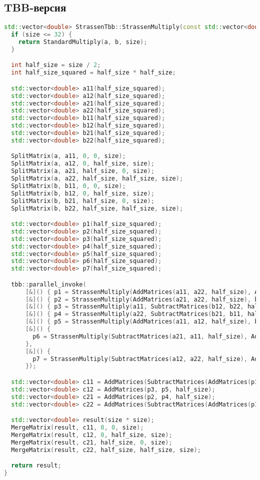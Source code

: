 \documentclass[14pt,a4paper]{extarticle}
\begin{document}
\subsection{TBB-версия}
\begin{lstlisting}[language=C++]
std::vector<double> StrassenTbb::StrassenMultiply(const std::vector<double>& a, const std::vector<double>& b, int size) {
  if (size <= 32) {
    return StandardMultiply(a, b, size);
  }

  int half_size = size / 2;
  int half_size_squared = half_size * half_size;

  std::vector<double> a11(half_size_squared);
  std::vector<double> a12(half_size_squared);
  std::vector<double> a21(half_size_squared);
  std::vector<double> a22(half_size_squared);
  std::vector<double> b11(half_size_squared);
  std::vector<double> b12(half_size_squared);
  std::vector<double> b21(half_size_squared);
  std::vector<double> b22(half_size_squared);

  SplitMatrix(a, a11, 0, 0, size);
  SplitMatrix(a, a12, 0, half_size, size);
  SplitMatrix(a, a21, half_size, 0, size);
  SplitMatrix(a, a22, half_size, half_size, size);
  SplitMatrix(b, b11, 0, 0, size);
  SplitMatrix(b, b12, 0, half_size, size);
  SplitMatrix(b, b21, half_size, 0, size);
  SplitMatrix(b, b22, half_size, half_size, size);

  std::vector<double> p1(half_size_squared);
  std::vector<double> p2(half_size_squared);
  std::vector<double> p3(half_size_squared);
  std::vector<double> p4(half_size_squared);
  std::vector<double> p5(half_size_squared);
  std::vector<double> p6(half_size_squared);
  std::vector<double> p7(half_size_squared);

  tbb::parallel_invoke(
      [&]() { p1 = StrassenMultiply(AddMatrices(a11, a22, half_size), AddMatrices(b11, b22, half_size), half_size); },
      [&]() { p2 = StrassenMultiply(AddMatrices(a21, a22, half_size), b11, half_size); },
      [&]() { p3 = StrassenMultiply(a11, SubtractMatrices(b12, b22, half_size), half_size); },
      [&]() { p4 = StrassenMultiply(a22, SubtractMatrices(b21, b11, half_size), half_size); },
      [&]() { p5 = StrassenMultiply(AddMatrices(a11, a12, half_size), b22, half_size); },
      [&]() {
        p6 = StrassenMultiply(SubtractMatrices(a21, a11, half_size), AddMatrices(b11, b12, half_size), half_size);
      },
      [&]() {
        p7 = StrassenMultiply(SubtractMatrices(a12, a22, half_size), AddMatrices(b21, b22, half_size), half_size);
      });

  std::vector<double> c11 = AddMatrices(SubtractMatrices(AddMatrices(p1, p4, half_size), p5, half_size), p7, half_size);
  std::vector<double> c12 = AddMatrices(p3, p5, half_size);
  std::vector<double> c21 = AddMatrices(p2, p4, half_size);
  std::vector<double> c22 = AddMatrices(SubtractMatrices(AddMatrices(p1, p3, half_size), p2, half_size), p6, half_size);

  std::vector<double> result(size * size);
  MergeMatrix(result, c11, 0, 0, size);
  MergeMatrix(result, c12, 0, half_size, size);
  MergeMatrix(result, c21, half_size, 0, size);
  MergeMatrix(result, c22, half_size, half_size, size);

  return result;
}
\end{lstlisting}
\end{document}
